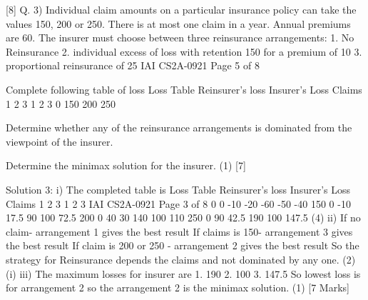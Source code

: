 [8]
Q. 3) Individual claim amounts on a particular insurance policy can take the values 150, 200 or
250. There is at most one claim in a year. Annual premiums are 60. The insurer must
choose between three reinsurance arrangements:
1. No Reinsurance
2. individual excess of loss with retention 150 for a premium of 10
3. proportional reinsurance of 25%
IAI CS2A-0921
Page 5 of 8
\item Complete following table of loss
Loss Table Reinsurer's loss Insurer's Loss
Claims 1 2 3 1 2 3
0
150
200
250

\item Determine whether any of the reinsurance arrangements is dominated from the
viewpoint of the insurer.

\item Determine the minimax solution for the insurer. (1)
[7]


Solution 3:
i)
The completed table is
Loss Table
Reinsurer's loss
Insurer's Loss
Claims
1
2
3
1
2
3
IAI CS2A-0921
Page 3 of 8
0
0
-10
-20
-60
-50
-40
150
0
-10
17.5
90
100
72.5
200
0
40
30
140
100
110
250
0
90
42.5
190
100
147.5
(4)
ii)
If no claim- arrangement 1 gives the best result
If claims is 150- arrangement 3 gives the best result
If claim is 200 or 250 - arrangement 2 gives the best result
So the strategy for Reinsurance depends the claims and not dominated by any one.
(2)
(i)
iii)
The maximum losses for insurer are
1. 190
2. 100
3. 147.5
So lowest loss is for arrangement 2 so the arrangement 2 is the minimax solution.
(1)
[7 Marks]
